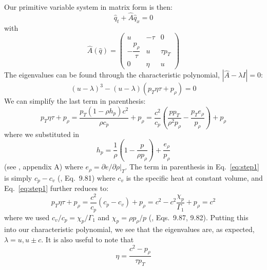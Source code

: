 Our primitive variable system in matrix form is then:
\begin{equation}
\hat{q}_t + \hat{A} \hat{q}_x = 0
\end{equation}
with
\begin{equation}
\renewcommand{\arraystretch}{1.5}
\hat{A}(\hat{q}) =
\left (
\begin{array}{ccc}
u                   & -\tau & 0 \\
-\dfrac{p_\rho}{\tau} & u    & \tau p_T \\
0                   & \eta & u
\end{array}
\right )
\end{equation}
The eigenvalues can be found through the characteristic polynomial,
$|\hat{A} - \lambda I| = 0$:
\begin{equation}
(u - \lambda)^3 - (u -\lambda) \left ( {p_T \eta\tau} + p_\rho \right ) = 0
\end{equation}
We can simplify the last term in parenthesis:
\begin{equation}
{p_T \eta\tau} + p_\rho = \frac{p_T (1 - \rho h_p) c^2}{\rho c_p} + p_\rho
                               = \frac{c^2}{c_p}\left ( \frac{p p_T}{\rho^2 p_\rho} - \frac{p_T e_\rho}{p_\rho} \right ) + p_\rho \label{eq:step1}
\end{equation}
where we substituted in
\begin{equation}
h_p = \frac{1}{\rho} \left ( 1 - \frac{p}{\rho p_\rho} \right ) + \frac{e_\rho}{p_\rho}
\end{equation}
(see \cite{ABRZ:I}, appendix A) where $e_\rho = \partial e/\partial
\rho |_T$.  The term in parenthesis in Eq.~\ref{eq:step1} is simply
$c_p - c_v$ (\cite{cg}, Eq.~9.81) where $c_v$ is the specific heat
at constant volume, and Eq.~\ref{eq:step1} further reduces to:
\begin{equation}
{p_T \eta\tau} + p_\rho = \frac{c^2}{c_p} (c_p - c_v) + p_\rho
                               = c^2 - c^2 \frac{\chi_p}{\Gamma_1} + p_\rho = c^2
\end{equation}
where we used $c_v/c_p = \chi_p/\Gamma_1$ and $\chi_p = \rho p_\rho /
p$ (\cite{cg}, Eqs.~9.87, 9.82).  Putting this into our
characteristic polynomial, we see that the eigenvalues are, as expected,
$\lambda = u, u \pm c$.  It is also useful to note that
\begin{equation}
\eta = \frac{c^2 - p_\rho}{\tau p_T}
\end{equation}


